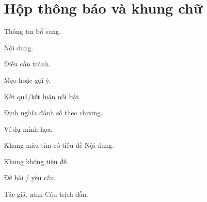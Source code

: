\section{Hộp thông báo và khung chữ}

\begin{vidulatex}
\begin{ghichu} Thông tin bổ sung. \end{ghichu}
\begin{luuy} Nội dung. \end{luuy}
\begin{canhbao} Điều cần tránh. \end{canhbao}
\begin{goiy} Mẹo hoặc gợi ý. \end{goiy}
\end{vidulatex}

\begin{vidulatex}
\begin{ketqua} Kết quả/kết luận nổi bật. \end{ketqua}
\begin{dinhnghia}[Tên] Định nghĩa đánh số theo chương. \end{dinhnghia}
\begin{vidu} Ví dụ minh họa. \end{vidu}
\end{vidulatex}

\begin{vidulatex}
\begin{khungchu}[tim]{Khung màu tím có tiêu đề} Nội dung. \end{khungchu}
\begin{khungchu}[ngoc] Khung không tiêu đề. \end{khungchu}
\begin{khungnetdut} Đề bài / yêu cầu. \end{khungnetdut}
\begin{trichdan}{Tác giả, năm} Câu trích dẫn. \end{trichdan}
\end{vidulatex}

\begin{vidulatex}
\begin{hangchiso}[3]
\end{hangchiso}
\end{vidulatex}

